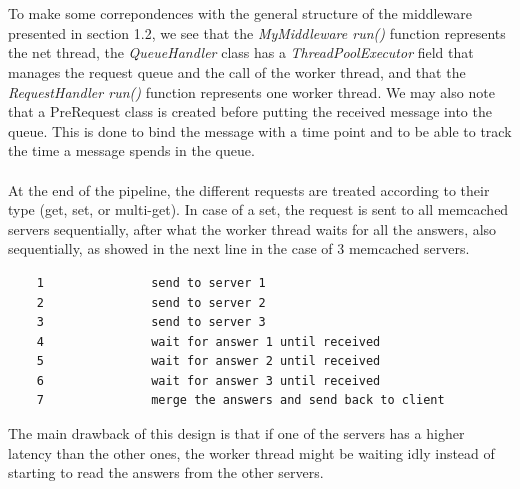 \documentclass[11pt,a4paper]{article}
\begin{document}
\\\\
To make some correpondences with the general structure of the middleware presented in section 1.2, we see that the \textit{MyMiddleware run()} function represents the net thread, the \textit{QueueHandler} class has a \textit{ThreadPoolExecutor} field that manages the request queue and the call of the worker thread, and that the \textit{RequestHandler run()} function represents one worker thread. We may also note that a PreRequest class is created before putting the received message into the queue. This is done to bind the message with a time point and to be able to track the time a message spends in the queue. 
\\\\
At the end of the pipeline, the different requests are treated according to their type (get, set, or multi-get). In case of a set, the request is sent to all memcached servers sequentially, after what the worker thread waits for all the answers, also sequentially, as showed in the next line in the case of 3 memcached servers. 
\begin{lstlisting}
	1				send to server 1
	2				send to server 2
	3				send to server 3
	4				wait for answer 1 until received
	5				wait for answer 2 until received
	6				wait for answer 3 until received
	7				merge the answers and send back to client
\end{lstlisting}
The main drawback of this design is that if one of the servers has a higher latency than the other ones, the worker thread might be waiting idly instead of starting to read the answers from the other servers. 
\end{document}
